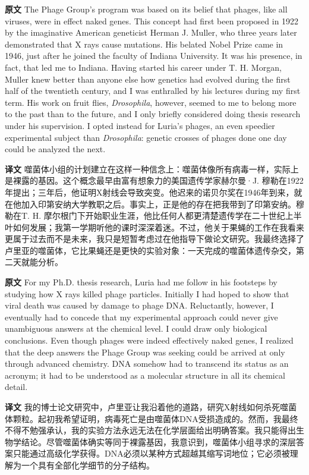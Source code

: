 \documentclass[UTF8,zihao=-4]{ctexart}
\newcommand{\BodyFont}{\fontsize{10.5pt}{15.5pt}\selectfont}
\renewenvironment{quote}{\par\noindent\begingroup\BodyFont}{\par\endgroup}
\begin{document}
\begin{quote}
\noindent\textbf{原文} The Phage Group's program was based on its belief that phages, like all viruses, were in effect naked genes. This concept had first been proposed in 1922 by the imaginative American geneticist Herman J. Muller, who three years later demonstrated that X rays cause mutations. His belated Nobel Prize came in 1946, just after he joined the faculty of Indiana University. It was his presence, in fact, that led me to Indiana. Having started his career under T. H. Morgan, Muller knew better than anyone else how genetics had evolved during the first half of the twentieth century, and I was enthralled by his lectures during my first term. His work on fruit flies, \emph{Drosophila}, however, seemed to me to belong more to the past than to the future, and I only briefly considered doing thesis research under his supervision. I opted instead for Luria's phages, an even speedier experimental subject than \emph{Drosophila}: genetic crosses of phages done one day could be analyzed the next.

\smallskip
\noindent\textbf{译文} 噬菌体小组的计划建立在这样一种信念上：噬菌体像所有病毒一样，实际上是裸露的基因。这个概念最早由富有想象力的美国遗传学家赫尔曼·J. 穆勒在1922年提出；三年后，他证明X射线会导致突变。他迟来的诺贝尔奖在1946年到来，就在他加入印第安纳大学教职之后。事实上，正是他的存在把我带到了印第安纳。穆勒在T. H. 摩尔根门下开始职业生涯，他比任何人都更清楚遗传学在二十世纪上半叶如何发展；我第一学期听他的课时深深着迷。不过，他关于果蝇的工作在我看来更属于过去而不是未来，我只是短暂考虑过在他指导下做论文研究。我最终选择了卢里亚的噬菌体，它比果蝇还是更快的实验对象：一天完成的噬菌体遗传杂交，第二天就能分析。
\end{quote}

\begin{quote}
\noindent\textbf{原文} For my Ph.D. thesis research, Luria had me follow in his footsteps by studying how X rays killed phage particles. Initially I had hoped to show that viral death was caused by damage to phage DNA. Reluctantly, however, I eventually had to concede that my experimental approach could never give unambiguous answers at the chemical level. I could draw only biological conclusions. Even though phages were indeed effectively naked genes, I realized that the deep answers the Phage Group was seeking could be arrived at only through advanced chemistry. DNA somehow had to transcend its status as an acronym; it had to be understood as a molecular structure in all its chemical detail.

\smallskip
\noindent\textbf{译文} 我的博士论文研究中，卢里亚让我沿着他的道路，研究X射线如何杀死噬菌体颗粒。起初我希望证明，病毒死亡是由噬菌体DNA受损造成的。然而，我最终不得不勉强承认，我的实验方法永远无法在化学层面给出明确答案。我只能得出生物学结论。尽管噬菌体确实等同于裸露基因，我意识到，噬菌体小组寻求的深层答案只能通过高级化学获得。DNA必须以某种方式超越其缩写词地位；它必须被理解为一个具有全部化学细节的分子结构。
\end{quote}
\end{document}
